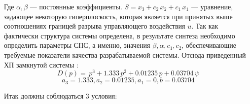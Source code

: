 Где $\alpha,\beta$ --- постоянные коэффициенты. 
 $S=x_3+c_2\,x_2+c_1\,x_1$ --- уравнение, задающее некоторую гиперплоскость, которая является при принятых выше соотношениях границей разрыва управляющего воздействия $u$.
	Так как фактически структура системы определена, в результате синтеза необходимо определить параметры СПС, а именно, значения $\beta,\alpha,c_1,c_2$, обеспечивающие требуемые показатели качества разрабатываемой системы. 
Отсюда приведенный ХП замкнутой системы :
\begin{equation} \label{eq:}
D(p)=\,p^3+1.333\,p^2+0.01235\,p+0.03704\,\psi
\end{equation}
\begin{equation} \label{eq:}
a_3=1.333,a_2=0.01235,a_1=0,b=0.03704
\end{equation}

Итак должны соблюдаться 3 условия:
